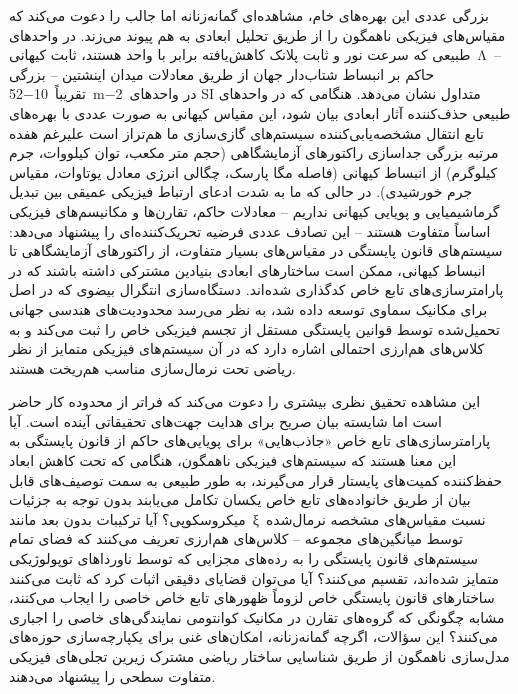 \documentclass[12pt, a4paper]{article}
\begin{document}
بزرگی عددی این بهره‌های خام، مشاهده‌ای گمانه‌زنانه اما جالب را دعوت می‌کند که مقیاس‌های فیزیکی ناهمگون را از طریق تحلیل ابعادی به هم پیوند می‌زند. در واحدهای طبیعی که سرعت نور و ثابت پلانک کاهش‌یافته برابر با واحد هستند، ثابت کیهانی Λ – حاکم بر انبساط شتاب‌دار جهان از طریق معادلات میدان اینشتین – بزرگی تقریباً 10−52 m−2 در واحدهای SI متداول نشان می‌دهد. هنگامی که در واحدهای طبیعی حذف‌کننده آثار ابعادی بیان شود، این مقیاس کیهانی به صورت عددی با بهره‌های تابع انتقال مشخصه‌یابی‌کننده سیستم‌های گازی‌سازی ما هم‌تراز است علیرغم هفده مرتبه بزرگی جداسازی راکتورهای آزمایشگاهی (حجم متر مکعب، توان کیلووات، جرم کیلوگرم) از انبساط کیهانی (فاصله مگا پارسک، چگالی انرژی معادل یوتاوات، مقیاس جرم خورشیدی). در حالی که ما به شدت ادعای ارتباط فیزیکی عمیقی بین تبدیل گرماشیمیایی و پویایی کیهانی نداریم – معادلات حاکم، تقارن‌ها و مکانیسم‌های فیزیکی اساساً متفاوت هستند – این تصادف عددی فرضیه تحریک‌کننده‌ای را پیشنهاد می‌دهد: سیستم‌های قانون پایستگی در مقیاس‌های بسیار متفاوت، از راکتورهای آزمایشگاهی تا انبساط کیهانی، ممکن است ساختارهای ابعادی بنیادین مشترکی داشته باشند که در پارامترسازی‌های تابع خاص کدگذاری شده‌اند. دستگاه‌سازی انتگرال بیضوی که در اصل برای مکانیک سماوی توسعه داده شد، به نظر می‌رسد محدودیت‌های هندسی جهانی تحمیل‌شده توسط قوانین پایستگی مستقل از تجسم فیزیکی خاص را ثبت می‌کند و به کلاس‌های هم‌ارزی احتمالی اشاره دارد که در آن سیستم‌های فیزیکی متمایز از نظر ریاضی تحت نرمال‌سازی مناسب هم‌ریخت هستند.

این مشاهده تحقیق نظری بیشتری را دعوت می‌کند که فراتر از محدوده کار حاضر است اما شایسته بیان صریح برای هدایت جهت‌های تحقیقاتی آینده است. آیا پارامترسازی‌های تابع خاص «جاذب‌هایی» برای پویایی‌های حاکم از قانون پایستگی به این معنا هستند که سیستم‌های فیزیکی ناهمگون، هنگامی که تحت کاهش ابعاد حفظ‌کننده کمیت‌های پایستار قرار می‌گیرند، به طور طبیعی به سمت توصیف‌های قابل بیان از طریق خانواده‌های تابع خاص یکسان تکامل می‌یابند بدون توجه به جزئیات میکروسکوپی؟ آیا ترکیبات بدون بعد مانند ξ نسبت مقیاس‌های مشخصه نرمال‌شده توسط میانگین‌های مجموعه – کلاس‌های هم‌ارزی تعریف می‌کنند که فضای تمام سیستم‌های قانون پایستگی را به رده‌های مجزایی که توسط ناورداهای توپولوژیکی متمایز شده‌اند، تقسیم می‌کنند؟ آیا می‌توان قضایای دقیقی اثبات کرد که ثابت می‌کنند ساختارهای قانون پایستگی خاص لزوماً ظهورهای تابع خاص خاصی را ایجاب می‌کنند، مشابه چگونگی که گروه‌های تقارن در مکانیک کوانتومی نمایندگی‌های خاصی را اجباری می‌کنند؟ این سؤالات، اگرچه گمانه‌زنانه، امکان‌های غنی برای یکپارچه‌سازی حوزه‌های مدل‌سازی ناهمگون از طریق شناسایی ساختار ریاضی مشترک زیرین تجلی‌های فیزیکی متفاوت سطحی را پیشنهاد می‌دهند.
\end{document}

